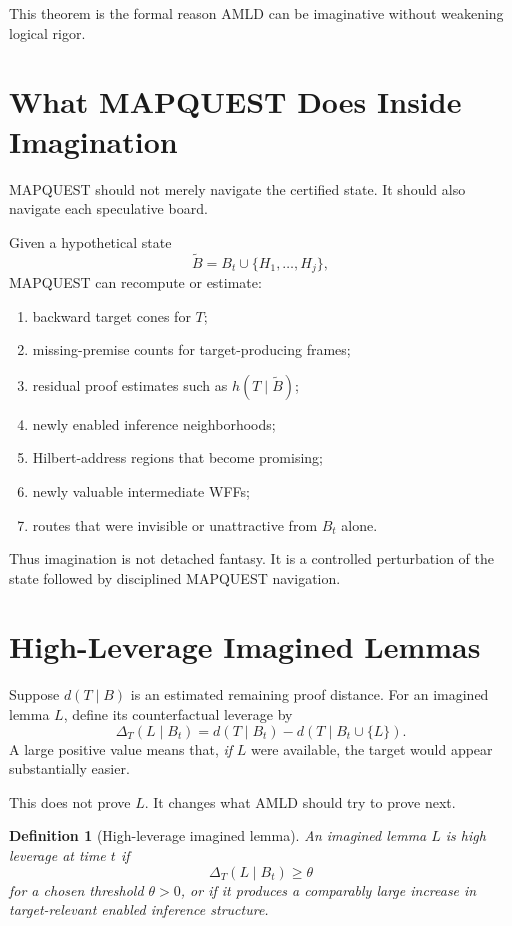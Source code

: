 \documentclass[11pt]{article}
\newtheorem{definition}{Definition}[section]
\begin{document}
This theorem is the formal reason AMLD can be imaginative without weakening logical rigor.

\section{What MAPQUEST Does Inside Imagination}

MAPQUEST should not merely navigate the certified state. It should also navigate each speculative board.

Given a hypothetical state
\[
\widetilde B=B_t\cup\{H_1,\dots,H_j\},
\]
MAPQUEST can recompute or estimate:
\begin{enumerate}[label=(\roman*)]
\item backward target cones for $T$;
\item missing-premise counts for target-producing frames;
\item residual proof estimates such as $\widehat h(T\mid\widetilde B)$;
\item newly enabled inference neighborhoods;
\item Hilbert-address regions that become promising;
\item newly valuable intermediate WFFs;
\item routes that were invisible or unattractive from $B_t$ alone.
\end{enumerate}

Thus imagination is not detached fantasy. It is a controlled perturbation of the state followed by disciplined MAPQUEST navigation.

\section{High-Leverage Imagined Lemmas}

Suppose $d(T\mid B)$ is an estimated remaining proof distance. For an imagined lemma $L$, define its counterfactual leverage by
\[
\Delta_T(L\mid B_t)
=
 d(T\mid B_t)-d(T\mid B_t\cup\{L\}).
\]
A large positive value means that, \emph{if} $L$ were available, the target would appear substantially easier.

This does not prove $L$. It changes what AMLD should try to prove next.

\begin{definition}[High-leverage imagined lemma]
An imagined lemma $L$ is high leverage at time $t$ if
\[
\Delta_T(L\mid B_t)\ge \theta
\]
for a chosen threshold $\theta>0$, or if it produces a comparably large increase in target-relevant enabled inference structure.
\end{definition}
\end{document}
